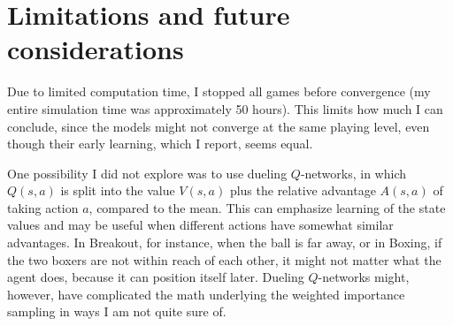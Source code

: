\documentclass{article}
\begin{document}
\section{Limitations and future considerations}
Due to limited computation time, I stopped all games before convergence (my entire simulation time was approximately 50 hours). This limits how much I can conclude, since the models might not converge at the same playing level, even though their early learning, which I report, seems equal.

One possibility I did not explore was to use dueling \(Q\)-networks, in which \(Q(s,a)\) is split into the value \(V(s,a)\) plus the relative advantage \(A(s,a)\) of taking action \(a\), compared to the mean. This can emphasize learning of the state values and may be useful when different actions have somewhat similar advantages. In Breakout, for instance, when the ball is far away, or in Boxing, if the two boxers are not within reach of each other, it might not matter what the agent does, because it can position itself later. Dueling \(Q\)-networks might, however, have complicated the math underlying the weighted importance sampling in ways I am not quite sure of.
\end{document}
